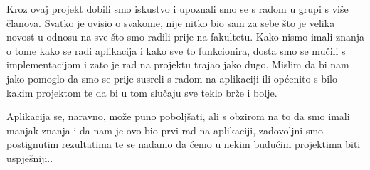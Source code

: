 		 Kroz ovaj projekt dobili smo iskustvo i upoznali smo se s radom u grupi s više članova. Svatko je ovisio o svakome, nije nitko bio sam za sebe što je velika novost u odnosu na sve što smo radili prije na fakultetu. Kako nismo imali znanja o tome kako se radi aplikacija i kako sve to funkcionira, dosta smo se mučili s implementacijom i zato je rad na projektu trajao jako dugo. Mislim da bi nam jako pomoglo da smo se prije susreli s radom na aplikaciji ili općenito s bilo kakim projektom te da bi u tom slučaju sve teklo brže i bolje.
		 
		 Aplikacija se, naravno, može puno poboljšati, ali s obzirom na to da smo imali manjak znanja i da nam je ovo bio prvi rad na aplikaciji, zadovoljni smo postignutim rezultatima te se nadamo da ćemo u nekim budućim projektima biti uspješniji..
		
		\eject 